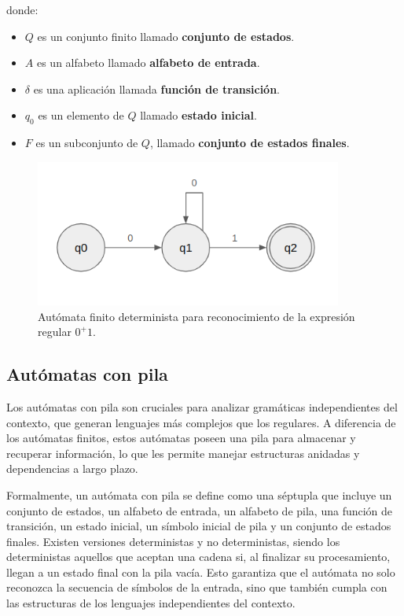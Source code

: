 \noindent
donde:
\begin{itemize}
    \item $Q$ es un conjunto finito llamado \textbf{conjunto de estados}.
    \item $A$ es un alfabeto llamado \textbf{alfabeto de entrada}.
    \item $\delta$ es una aplicación llamada \textbf{función de transición}.
    \item $q_0$ es un elemento de $Q$ llamado \textbf{estado inicial}.
    \item $F$ es un subconjunto de $Q$, llamado \textbf{conjunto de estados finales}.
\end{itemize}

\begin{figure}[h]
    \centering
    \includegraphics[width=0.9\textwidth]{images/pl/auto1.png}
    \caption{Autómata finito determinista para reconocimiento de la expresión regular $0^+1$.}
    \label{fig:PLAutomt}
\end{figure}

\subsection{Autómatas con pila}\label{subsection:automatPila}
Los autómatas con pila son cruciales para analizar gramáticas independientes del contexto, que generan lenguajes más complejos que los regulares. A diferencia de los autómatas finitos, estos autómatas poseen una pila para almacenar y recuperar información, lo que les permite manejar estructuras anidadas y dependencias a largo plazo.

Formalmente, un autómata con pila se define como una séptupla que incluye un conjunto de estados, un alfabeto de entrada, un alfabeto de pila, una función de transición, un estado inicial, un símbolo inicial de pila y un conjunto de estados finales. Existen versiones deterministas y no deterministas, siendo los deterministas aquellos que aceptan una cadena si, al finalizar su procesamiento, llegan a un estado final con la pila vacía. Esto garantiza que el autómata no solo reconozca la secuencia de símbolos de la entrada, sino que también cumpla con las estructuras de los lenguajes independientes del contexto.

